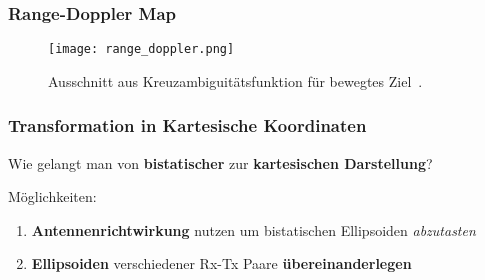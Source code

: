 \begin{frame}
    \frametitle{Range-Doppler Map}

    \begin{figure}
        \centering
        \texttt{[image: range\_doppler.png]}
        \caption{Ausschnitt aus Kreuzambiguitätsfunktion für bewegtes Ziel~\cite[p.~161]{Malanowski2019}.}
    \end{figure}
\end{frame}

\begin{frame}
    \frametitle{Transformation in Kartesische Koordinaten}

    \Large Wie gelangt man von \textbf{bistatischer} zur \textbf{kartesischen Darstellung}?\normalsize

    \vspace{2\baselineskip}

    Möglichkeiten:
    \begin{enumerate}
        \item \textbf{Antennenrichtwirkung} nutzen um bistatischen Ellipsoiden \emph{abzutasten}
        \item \textbf{Ellipsoiden} verschiedener Rx-Tx Paare \textbf{übereinanderlegen}
    \end{enumerate}
\end{frame}
